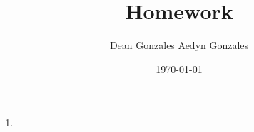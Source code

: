 \documentclass[twocolumn]{article}
\title{Homework }
\author{Dean Gonzales Aedyn Gonzales}
\date{\today}
\begin{document}
\maketitle

\begin{enumerate}
    \item
\end{enumerate}
\end{document}
